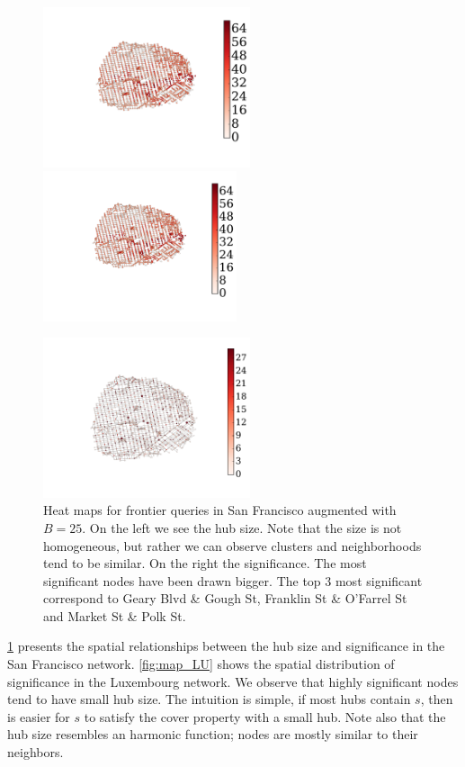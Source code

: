 	
\begin{figure}
\begin{minipage}[t]{.53\textwidth}
\includegraphics[clip, trim=4.6cm 4.8cm 4.7cm 3cm,height=4.7cm]{TexImg/SF_hub_sizes.pdf}%
\includegraphics[clip, trim=15.8cm 0cm 0.4cm 1cm,height=4.4cm]{TexImg/SF_hub_sizes.pdf}
\end{minipage}%
\begin{minipage}[t]{.47\textwidth}
\flushright
\includegraphics[clip, trim=3.7cm 2.9cm 4.2cm 3cm,height=4.7cm]{TexImg/sig_colapse.pdf}
\end{minipage}
\caption{Heat maps for frontier queries in San Francisco augmented with $B=25$.
On the left we see the hub size. 
Note that the size is not homogeneous, but rather we can observe clusters and neighborhoods tend to be similar.
On the right the significance.
The most significant nodes have been drawn bigger.
The top 3 most significant correspond to Geary Blvd \& Gough St, Franklin St \& O'Farrel St and Market St \& Polk St.
}
\label{fig:heat_maps}
\end{figure}

\cref{fig:heat_maps} presents the spatial relationships between the hub size and significance in the San Francisco network. 
\cref{fig:map_LU} shows the spatial distribution of significance in the Luxembourg network.
We observe that highly significant nodes tend to have small hub size.
The intuition is simple, if most hubs contain $s$, then is easier for $s$ to satisfy the cover property with a small hub.
Note also that the hub size resembles an harmonic function; nodes are mostly similar to their neighbors.

